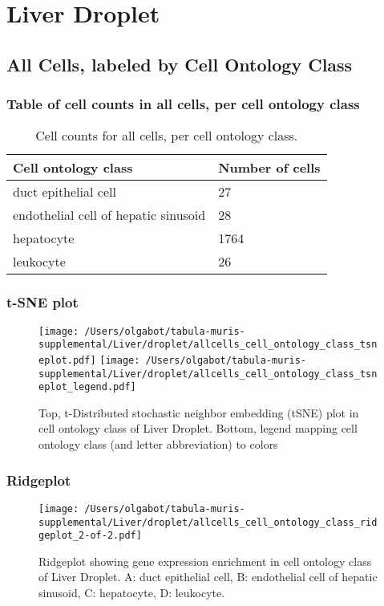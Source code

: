 \newpage
\section{Liver Droplet}

\subsection{All Cells, labeled by Cell Ontology Class}
\subsubsection{Table of cell counts in all cells, per cell ontology class}\begin{table}[h]
\centering
\label{my-label}
\begin{tabular}{@{}ll@{}}
\toprule

Cell ontology class& Number of cells \\ \midrule
duct epithelial cell & 27 \\

endothelial cell of hepatic sinusoid & 28 \\

hepatocyte & 1764 \\

leukocyte & 26 \\
\bottomrule
\end{tabular}
\caption{Cell counts for all cells, per cell ontology class.}
\end{table}

\newpage
\subsubsection{t-SNE plot}
\begin{figure}[h]
\centering
\texttt{[image: /Users/olgabot/tabula-muris-supplemental/Liver/droplet/allcells\_cell\_ontology\_class\_tsneplot.pdf]}
\texttt{[image: /Users/olgabot/tabula-muris-supplemental/Liver/droplet/allcells\_cell\_ontology\_class\_tsneplot\_legend.pdf]}
\caption{Top, t-Distributed stochastic neighbor embedding (tSNE) plot  in cell ontology class of Liver Droplet. Bottom, legend mapping cell ontology class (and letter abbreviation) to colors}
\end{figure}


\newpage
\newpage
\subsubsection{Ridgeplot}
\begin{figure}[h]
\centering
\texttt{[image: /Users/olgabot/tabula-muris-supplemental/Liver/droplet/allcells\_cell\_ontology\_class\_ridgeplot\_2-of-2.pdf]}

\caption{ Ridgeplot  showing gene expression enrichment in cell ontology class of Liver Droplet. A: duct epithelial cell, B: endothelial cell of hepatic sinusoid, C: hepatocyte, D: leukocyte.}
\end{figure}


